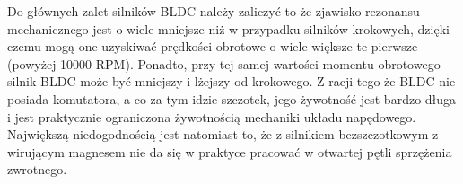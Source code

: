 Do głównych zalet silników BLDC należy zaliczyć to że zjawisko rezonansu mechanicznego jest o wiele mniejsze niż w przypadku silników krokowych, dzięki czemu mogą one uzyskiwać prędkości obrotowe o wiele większe te pierwsze (powyżej 10000 RPM). Ponadto, przy tej samej wartości momentu obrotowego silnik BLDC może być mniejszy i lżejszy od krokowego. Z racji tego że BLDC nie posiada komutatora, a co za tym idzie szczotek, jego żywotność jest bardzo długa i jest praktycznie ograniczona żywotnością mechaniki układu napędowego. Największą niedogodnością jest natomiast to, że z silnikiem bezszczotkowym z wirującym magnesem nie da się w praktyce pracować w otwartej pętli sprzężenia zwrotnego.

\clearpage

